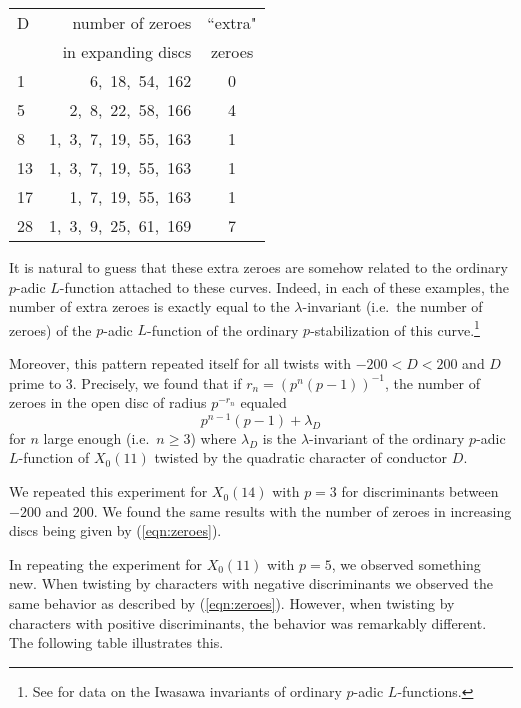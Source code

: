 \documentclass{amsart}
\theoremstyle{plain}
\theoremstyle{definition}
\begin{document}
\begin{center}
\begin{tabular}{|l|r||c|}
\hline
D & number of zeroes & ``extra"\\ 
&in expanding discs & zeroes\\
\hline
1 & 6,~18,~54,~162 & 0 \\
\hline
5 & 2,~8,~22,~58,~166 & 4\\
\hline
8 & 1,~3,~7,~19,~55,~163 & 1\\
\hline
13 & 1,~3,~7,~19,~55,~163 & 1\\
\hline
17 & 1,~7,~19,~55,~163 & 1\\
\hline
28 & 1,~3,~9,~25,~61,~169 & 7\\
\hline
\end{tabular}
\end{center}

\vspace{.2cm}

It is natural to guess that these extra zeroes are somehow related to the ordinary $p$-adic $L$-function attached to these curves.  Indeed, in each of these examples, the number of extra zeroes is exactly equal to the $\lambda$-invariant (i.e.\ the number of zeroes) of the $p$-adic $L$-function of the ordinary $p$-stabilization of this curve.\footnote{See \cite{PollackData} for data on the Iwasawa invariants of ordinary $p$-adic $L$-functions.}

Moreover, this pattern repeated itself for all twists with $-200 < D < 200$ and $D$ prime to $3$.  Precisely, we found that if $r_n = (p^{n}(p-1))^{-1}$, the number of zeroes in the open disc of radius $p^{-r_n}$ equaled
\begin{equation}
\label{eqn:zeroes}
p^{n-1} (p-1) + \lambda_D
\end{equation}
for $n$ large enough (i.e.\ $n \geq 3$) where $\lambda_D$ is the $\lambda$-invariant of the ordinary $p$-adic $L$-function of $X_0(11)$ twisted by the quadratic character of conductor $D$. 

We repeated this experiment for $X_0(14)$ with $p=3$ for discriminants between $-200$ and $200$.  We found the same results with the number of zeroes in increasing discs being given by (\ref{eqn:zeroes}).

In repeating the experiment for $X_0(11)$ with $p=5$, we observed something new.  When twisting by characters with negative discriminants we observed the same behavior as described by (\ref{eqn:zeroes}).  However, when twisting by characters with positive discriminants, the behavior was remarkably different.  The following table illustrates this.
\end{document}
